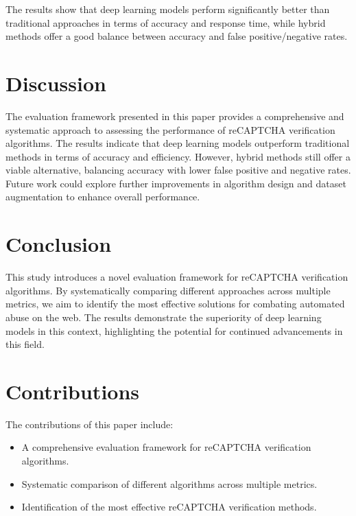 \documentclass{article}
\begin{document}
The results show that deep learning models perform significantly better than traditional approaches in terms of accuracy and response time, while hybrid methods offer a good balance between accuracy and false positive/negative rates.

\section{Discussion}
The evaluation framework presented in this paper provides a comprehensive and systematic approach to assessing the performance of reCAPTCHA verification algorithms. The results indicate that deep learning models outperform traditional methods in terms of accuracy and efficiency. However, hybrid methods still offer a viable alternative, balancing accuracy with lower false positive and negative rates. Future work could explore further improvements in algorithm design and dataset augmentation to enhance overall performance.

\section{Conclusion}
This study introduces a novel evaluation framework for reCAPTCHA verification algorithms. By systematically comparing different approaches across multiple metrics, we aim to identify the most effective solutions for combating automated abuse on the web. The results demonstrate the superiority of deep learning models in this context, highlighting the potential for continued advancements in this field.

\section{Contributions}
The contributions of this paper include:
\begin{itemize}
    \item A comprehensive evaluation framework for reCAPTCHA verification algorithms.
    \item Systematic comparison of different algorithms across multiple metrics.
    \item Identification of the most effective reCAPTCHA verification methods.
\end{itemize}



\end{document}
